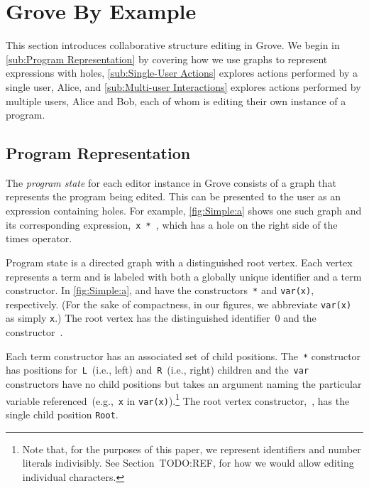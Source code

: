 
\section{Grove By Example}%
\label{sec:Grove By Example}

This section introduces collaborative structure editing in Grove.
We begin in \autoref{sub:Program Representation} by covering how we use graphs to represent expressions with holes,
\autoref{sub:Single-User Actions} explores actions performed by a single user, Alice,
and \autoref{sub:Multi-user Interactions} explores actions performed by multiple users, Alice and Bob,
each of whom is editing their own instance of a program.

\subsection{Program Representation}%
\label{sub:Program Representation}

\figureSimple{}

The \textit{program state} for each editor instance in Grove consists of a graph that represents the program being edited.
This can be presented to the user as an expression containing holes.
For example, \autoref{fig:Simple:a} shows one such graph and its corresponding expression,~\texttt{x * \hole}, which
has a hole on the right side of the times operator.

Program state is a directed graph with a distinguished root vertex.
Each vertex represents a term and is labeled with both a globally unique identifier and a term constructor.
In \autoref{fig:Simple:a}, \vSimpleTimes{} and \vSimpleX{} have the constructors~\texttt{*} and \texttt{var(x)}, respectively. (For the sake of compactness, in our figures, we abbreviate \texttt{var(x)} as simply \texttt{x}.)
The root vertex has the distinguished identifier~0 and the constructor~\textbullet.

Each term constructor has an associated set of child positions.
The~\texttt{*} constructor has positions for~\texttt{L}~(i.e., left) and~\texttt{R}~(i.e., right) children
and the~\texttt{var} constructors have no child positions but takes an argument naming the particular
variable referenced~(e.g.,~\texttt{x} in \texttt{var(x)}).\footnote{Note that,
  for the purposes of this paper, we represent identifiers and number literals
  indivisibly.  See Section~TODO:REF, for how we would allow editing individual characters.}
The root vertex constructor,~\textbullet, has the single child position \texttt{Root}.

